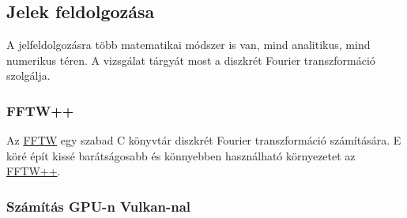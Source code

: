 
\subsection{Jelek feldolgoz\'asa}

A jelfeldolgoz\'asra t\"obb matematikai m\'odszer is van, mind analitikus, mind numerikus t\'eren.
A vizsg\'alat t\'argy\'at most a diszkr\'et Fourier transzform\'aci\'o szolg\'alja.

\subsubsection{FFTW++}
Az \href{http://www.fftw.org/}{FFTW} egy szabad C k\"onyvt\'ar diszkr\'et Fourier transzform\'aci\'o sz\'am\'it\'as\'ara.
E k\"or\'e \'ep\'it kiss\'e bar\'ats\'agosabb \'es k\"onnyebben haszn\'alhat\'o k\"ornyezetet az \href{http://fftwpp.sourceforge.net/}{FFTW++}.



\subsubsection{Sz\'am\'it\'as GPU-n Vulkan-nal}